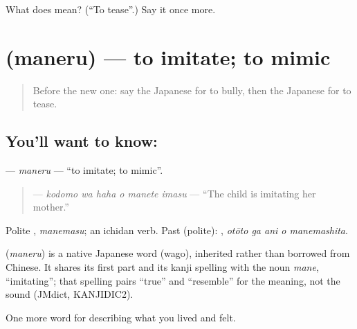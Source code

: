 \begin{tcolorbox}[breakable,colback=teal!4,colframe=teal!35!black,title={Before you move on}]
What does  mean? (\textquotedblleft{}To tease\textquotedblright{}.) Say it once more.
\end{tcolorbox}
\section[\texorpdfstring{\ja{まねる} (maneru)}{まねる (maneru)}]{ (maneru) — to imitate; to mimic}

\label{lesson:JA-C478-maneru}



\begin{quote}
Before the new one: say the Japanese for to bully, then the Japanese for to tease.
\end{quote}

\subsection*{You'll want to know: }
\textbf{} — \emph{maneru} — \textquotedblleft{}to imitate; to mimic\textquotedblright{}.

\begin{quote}
\textbf{  } — \emph{kodomo wa haha o manete imasu} — \textquotedblleft{}The child is imitating her mother.\textquotedblright{}
\end{quote}

Polite \textbf{}, \emph{manemasu}; an ichidan verb. Past (polite): \textbf{  }, \emph{otōto ga ani o manemashita}.

\begin{cousinweb}
\textbf{} (\emph{maneru}) is a native Japanese word (wago), inherited rather than borrowed from Chinese. It shares its first part and its kanji spelling with the noun \emph{mane}, \textquotedblleft{}imitating\textquotedblright{}; that spelling pairs \textquotedblleft{}true\textquotedblright{} and \textquotedblleft{}resemble\textquotedblright{} for the meaning, not the sound (JMdict, KANJIDIC2).
\end{cousinweb}

\begin{grammarlens}[title={What you've built}]
One more word for describing what you lived and felt.
\end{grammarlens}

